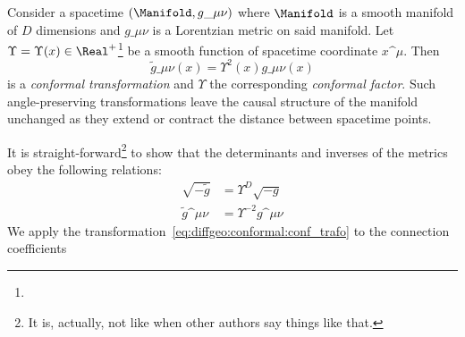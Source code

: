 


\newcommand*\cfac{\Upsilon}   %




\begin{draft}

Consider a spacetime $(\Manifold, g\_{\mu\nu})$ where $\Manifold$ is a smooth manifold of $D$ dimensions and $g\_{\mu\nu}$ is a Lorentzian metric on said manifold. Let $\cfac= \cfac(x)\in \Real^+$\footnote{} be a smooth function of spacetime coordinate $x\^\mu$. Then
\begin{equation}\label{eq:diffgeo:conformal:conf_trafo}
    \tilde{g}\_{\mu\nu}(x ) = \cfac^2(x) g\_{\mu\nu}(x)
\end{equation}
is a \emph{conformal transformation} and $\cfac$ the corresponding \emph{conformal factor}. Such angle-preserving transformations leave the causal structure of the manifold unchanged as they extend or contract the distance between spacetime points. 


\blahblah

It is straight-forward\footnote{It is, actually, not like when other authors say things like that.} to show that the determinants and inverses of the metrics obey the following relations:
\begin{equation}
    \begin{split}
        \sqrt{-\tilde{g}}   &= \cfac^D \sqrt{-g} \\
        \tilde{g}\^{\mu\nu} &= \cfac^{-2} g\^{\mu\nu}
    \end{split}
\end{equation}
We apply the transformation~\cref{eq:diffgeo:conformal:conf_trafo} to the connection coefficients

\blahblah
{
\newcommand*\Chr{\ChristoffelSym}
\newcommand*\Chrt{\ChristoffelSym[\tilde{\Gamma}]}
\newcommand*\Kd{\Krondelta}
\newcommand*\Ri{\RicciScalar}



}
\end{draft}
